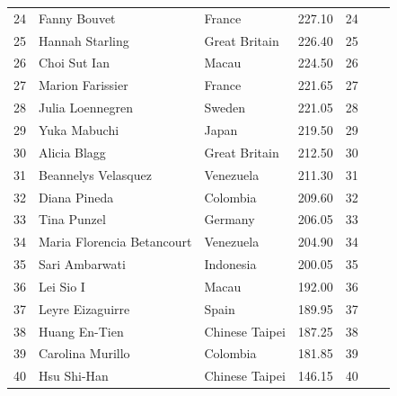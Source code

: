 \documentclass{article}
\begin{document}
\begin{tabular}{lllllll}
24 & Fanny Bouvet & France & 227.10 & 24 &  &  \\
25 & Hannah Starling & Great Britain & 226.40 & 25 &  &  \\
26 & Choi Sut Ian & Macau & 224.50 & 26 &  &  \\
27 & Marion Farissier & France & 221.65 & 27 &  &  \\
28 & Julia Loennegren & Sweden & 221.05 & 28 &  &  \\
29 & Yuka Mabuchi & Japan & 219.50 & 29 &  &  \\
30 & Alicia Blagg & Great Britain & 212.50 & 30 &  &  \\
31 & Beannelys Velasquez & Venezuela & 211.30 & 31 &  &  \\
32 & Diana Pineda & Colombia & 209.60 & 32 &  &  \\
33 & Tina Punzel & Germany & 206.05 & 33 &  &  \\
34 & Maria Florencia Betancourt & Venezuela & 204.90 & 34 &  &  \\
35 & Sari Ambarwati & Indonesia & 200.05 & 35 &  &  \\
36 & Lei Sio I & Macau & 192.00 & 36 &  &  \\
37 & Leyre Eizaguirre & Spain & 189.95 & 37 &  &  \\
38 & Huang En-Tien & Chinese Taipei & 187.25 & 38 &  &  \\
39 & Carolina Murillo & Colombia & 181.85 & 39 &  &  \\
40 & Hsu Shi-Han & Chinese Taipei & 146.15 & 40 &  &  \\
\bottomrule
\end{tabular}
\end{document}
